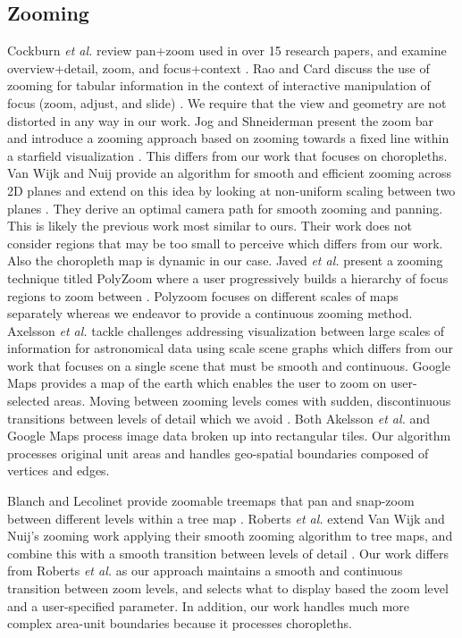 \subsection{Zooming}
Cockburn \textit{et al.} review pan+zoom used in over 15 research papers, and examine overview+detail, zoom, and focus+context \cite{cockburn2008review}.
Rao and Card discuss the use of zooming for tabular information in the context of interactive manipulation of focus (zoom, adjust, and slide) \cite{rao1994table}. We require that the view and geometry are not distorted in any way in our work. Jog and Shneiderman present the zoom bar and introduce a zooming approach based on zooming towards a fixed line within a starfield visualization \cite{jog1995starfield}. This differs from our work that focuses on choropleths. Van Wijk and Nuij provide an algorithm for smooth and efficient zooming across 2D planes \cite{van2003smooth} and extend on this idea by looking at non-uniform scaling between two planes \cite{van2004model}. They derive an optimal camera path for smooth zooming and panning. This is likely the previous work most similar to ours. Their work does not consider regions that may be too small to perceive which differs from our work. Also the choropleth map is dynamic in our case. Javed \textit{et al.} present a zooming technique titled PolyZoom where a user progressively builds a hierarchy of focus regions to zoom between \cite{javed2012polyzoom}. Polyzoom focuses on different scales of maps separately whereas we endeavor to provide a continuous zooming method. Axelsson \textit{et al.} tackle challenges addressing visualization between large scales of information for astronomical data using scale scene graphs \cite{axelsson2017dynamic} which differs from our work that focuses on a single scene that must be smooth and continuous. Google Maps provides a map of the earth which enables the user to zoom on user-selected areas. Moving between zooming levels comes with sudden, discontinuous transitions between levels of detail which we avoid \cite{googleMaps}. Both Akelsson \textit{et al.} and Google Maps process image data broken up into rectangular tiles. Our algorithm processes original unit areas and handles geo-spatial boundaries composed of vertices and edges.

Blanch and Lecolinet provide zoomable treemaps that pan and snap-zoom between different levels within a tree map \cite{blanch2007browsing}. Roberts \textit{et al.} extend Van Wijk and Nuij's zooming work applying their smooth zooming algorithm to tree maps, and combine this with a smooth transition between levels of detail \cite{roberts2016interactive}. Our work differs from Roberts \textit{et al.} as  our approach maintains a smooth and continuous transition between zoom levels, and selects what to display based the zoom level and a user-specified parameter. In addition, our work handles much more complex area-unit boundaries because it processes choropleths.


